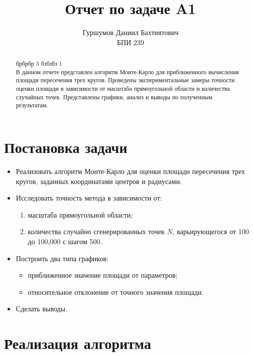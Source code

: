 \documentclass{article}
\title{Отчет по задаче A1}
\author{Гуршумов Даниил Бахтиятович \\ БПИ 239}
\date{}
\begin{document}
\maketitle

\begin{abstract}
брбрбр 3 бзбзбз 1
\\В данном отчете представлен алгоритм Монте-Карло для приближенного вычисления площади пересечения трех кругов. Проведены экспериментальные замеры точности оценки площади в зависимости от масштаба прямоугольной области и количества случайных точек. Представлены графики, анализ и выводы по полученным результатам.
\end{abstract}

\section{Постановка задачи}
\begin{itemize}
    \item Реализовать алгоритм Монте-Карло для оценки площади пересечения трех кругов, заданных координатами центров и радиусами.
    \item Исследовать точность метода в зависимости от:
    \begin{enumerate}
        \item масштаба прямоугольной области;
        \item количества случайно сгенерированных точек \(N\), варьирующегося от 100 до 100,000 с шагом 500.
    \end{enumerate}
    \item Построить два типа графиков:
    \begin{itemize}
        \item приближенное значение площади от параметров;
        \item относительное отклонение от точного значения площади.
    \end{itemize}
    \item Сделать выводы.
\end{itemize}

\section{Реализация алгоритма}
\end{document}
